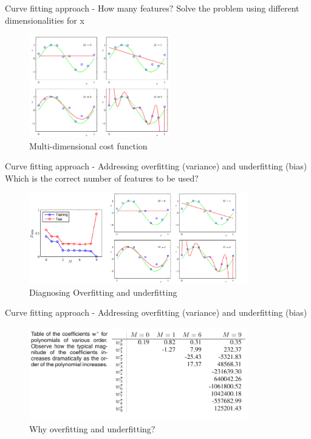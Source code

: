 \documentclass{beamer}
\begin{document}
\begin{frame}{Curve fitting approach - How many features$?$}
Solve the problem using different dimensionalities for x
\begin{figure}
  \centering
    \includegraphics[width=0.55\textwidth]{howmanyfeatures}
  		\caption{ Multi-dimensional cost function }
    \label{howmanyfeatures}
 \end{figure}
\end{frame}

\begin{frame}{ Curve fitting approach - Addressing overfitting (variance) and underfitting (bias) }
Which is the correct number of features to be used$?$
\begin{figure}
  \centering
    \includegraphics[width=0.85\textwidth]{performance}
  		\caption{ Diagnosing Overfitting and underfitting }
    \label{performance}
 \end{figure}
\end{frame}

\begin{frame}{ Curve fitting approach - Addressing overfitting (variance) and underfitting (bias) }
\begin{figure}
  \centering
    \includegraphics[width=0.85\textwidth]{whyoverunderfit}
  		\caption{ Why overfitting and underfitting$?$ }
    \label{performance}
 \end{figure}
\end{frame}
\end{document}
